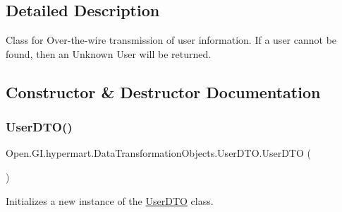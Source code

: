 \subsection{Detailed Description}
Class for Over-\/the-\/wire transmission of user information. If a user cannot be found, then an Unknown User will be returned. 



\subsection{Constructor \& Destructor Documentation}
\hypertarget{class_open_1_1_g_i_1_1hypermart_1_1_data_transformation_objects_1_1_user_d_t_o_ab715e6cac8b432f39c5fe6f22e3db645}{}\label{class_open_1_1_g_i_1_1hypermart_1_1_data_transformation_objects_1_1_user_d_t_o_ab715e6cac8b432f39c5fe6f22e3db645} 
\subsubsection{\texorpdfstring{User\+D\+T\+O()}{UserDTO()}\hspace{0.1cm}{\footnotesize\ttfamily [1/2]}}
{\footnotesize\ttfamily Open.\+G\+I.\+hypermart.\+Data\+Transformation\+Objects.\+User\+D\+T\+O.\+User\+D\+TO (\begin{DoxyParamCaption}{ }\end{DoxyParamCaption})}



Initializes a new instance of the \hyperlink{class_open_1_1_g_i_1_1hypermart_1_1_data_transformation_objects_1_1_user_d_t_o}{User\+D\+TO} class. 

\hypertarget{class_open_1_1_g_i_1_1hypermart_1_1_data_transformation_objects_1_1_user_d_t_o_a21ce2f8eaac0781bcc484f8eeca38404}{}\label{class_open_1_1_g_i_1_1hypermart_1_1_data_transformation_objects_1_1_user_d_t_o_a21ce2f8eaac0781bcc484f8eeca38404} 
